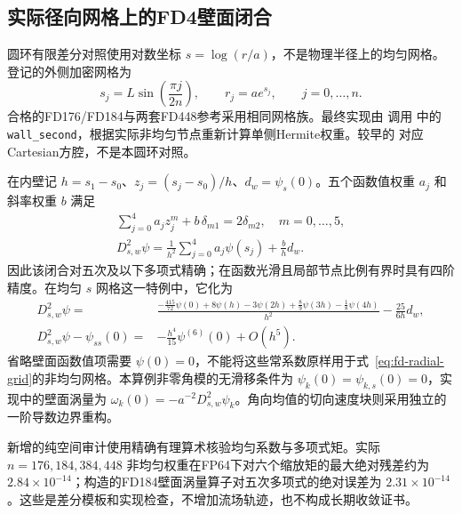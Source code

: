 \subsection{实际径向网格上的FD4壁面闭合}
\label{sec:fd-wall-closure}

圆环有限差分对照使用对数坐标 $s=\log(r/a)$，不是物理半径上的均匀网格。登记的外侧加密网格为
\begin{equation}
 s_j=L\sin\!\left(\frac{\pi j}{2n}\right),\qquad
 r_j=a e^{s_j},\qquad j=0,\ldots,n.
 \label{eq:fd-radial-grid}
\end{equation}
合格的FD176/FD184与两套FD448参考采用相同网格族。最终实现由  调用  中的 \texttt{wall\_second}，根据实际非均匀节点重新计算单侧Hermite权重。较早的  对应Cartesian方腔，不是本圆环对照。

在内壁记 $h=s_1-s_0$、$z_j=(s_j-s_0)/h$、$d_w=\psi_s(0)$。五个函数值权重 $a_j$ 和斜率权重 $b$ 满足
\begin{equation}
 \begin{gathered}
 \sum_{j=0}^{4}a_j z_j^m+b\,\delta_{m1}=2\delta_{m2},
 \quad m=0,\ldots,5,\\
 D_{s,w}^2\psi=\frac{1}{h^2}\sum_{j=0}^{4}a_j\psi(s_j)
                     +\frac{b}{h}d_w.
 \end{gathered}
 \label{eq:fd-hermite-moments}
\end{equation}
因此该闭合对五次及以下多项式精确；在函数光滑且局部节点比例有界时具有四阶精度。在均匀 $s$ 网格这一特例中，它化为
\begin{equation}
 \begin{split}
 D_{s,w}^2\psi={}&\frac{-\frac{415}{72}\psi(0)+8\psi(h)-3\psi(2h)
                         +\frac89\psi(3h)-\frac18\psi(4h)}{h^2}
                    -\frac{25}{6h}d_w,\\
 D_{s,w}^2\psi-\psi_{ss}(0)={}&-\frac{h^4}{15}\psi^{(6)}(0)+O(h^5).
 \end{split}
 \label{eq:fd-uniform-wall}
\end{equation}
省略壁面函数值项需要 $\psi(0)=0$，不能将这些常系数原样用于式~\eqref{eq:fd-radial-grid}的非均匀网格。本算例非零角模的无滑移条件为 $\psi_k(0)=\psi_{k,s}(0)=0$，实现中的壁面涡量为 $\omega_k(0)=-a^{-2}D_{s,w}^2\psi_k$。角向均值的切向速度块则采用独立的一阶导数边界重构。

新增的纯空间审计使用精确有理算术核验均匀系数与多项式矩。实际 $n=176,184,384,448$ 非均匀权重在FP64下对六个缩放矩的最大绝对残差约为 $2.84\times10^{-14}$；构造的FD184壁面涡量算子对五次多项式的绝对误差为 $2.31\times10^{-14}$。这些是差分模板和实现检查，不增加流场轨迹，也不构成长期收敛证书。
